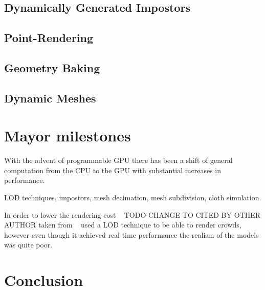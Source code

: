 \documentclass[conference]{acmsiggraph}
\begin{document}
\subsection{Dynamically Generated Impostors}
\subsection{Point-Rendering}
\subsection{Geometry Baking}
\subsection{Dynamic Meshes}

\section{Mayor milestones}

With the advent of programmable GPU there has been a shift of general computation from the CPU to the GPU with substantial increases in performance.

LOD techniques, impostors, mesh decimation, mesh subdivision, cloth simulation.

In order to lower the rendering cost ~\cite{pratt1997humans} TODO CHANGE TO CITED BY OTHER AUTHOR taken from ~\cite{Aubel1999} used a LOD technique to be able to render crowds, however even though it  achieved real time performance the realism of the models was quite poor.



\section{Conclusion}



\end{document}
